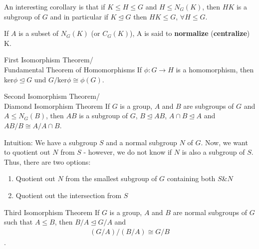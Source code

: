 \documentclass[titlepage, 12pt]{article}
\begin{document}
An interesting corollary is that if $ K \le H \le G$ and
$H\le N_G(K)$, then $HK$ is a subgroup of $G$ and in particular if
$K\trianglelefteq G$ then $HK\le G$, $\forall H\le G$.
\begin{definition}{}{}
    If $A$ is a subset of $N_G(K)$ (or $C_G(K)$), A is said to
    \textbf{normalize} (\textbf{centralize}) K.
\end{definition}
\begin{theorem}{First Isomorphism Theorem/\\Fundamental Theorem of Homomorphisms}{}
    If $\phi:G\rightarrow H$ is a homomorphism, then ker$\phi\trianglelefteq G$
    und $G/\text{ker}\phi\cong \phi(G)$.
\end{theorem}
\begin{theorem}{Second Isomorphism Theorem/\\Diamond Isomorphism Theorem}{}
    If $G$ is a group, $A$ and $B$ are subgroups of $G$ and $A\le N_G(B)$, then
    $AB$ is a subgroup of $G$, $B\trianglelefteq AB$, $A\cap B\trianglelefteq A$
    and $AB/B\cong A/A\cap B$.
\end{theorem}
Intuition: We have a subgroup $S$ and a normal subgroup $N$ of $G$. Now, we want
to quotient out $N$ from $S$ - however, we do not know if $N$ is also a subgroup
of $S$. Thus, there are two options:
\begin{enumerate}
    \item Quotient out $N$ from the smallest subgroup of $G$ containing both
        $S$\&$N$
    \item Quotient out the intersection from $S$
\end{enumerate}
\begin{theorem}{Third Isomorphism Theorem}{}
    If $G$ is a group, $A$ and $B$ are normal subgroups of $G$ such that $A\le
    B$, then $B/A\trianglelefteq G/A$ and 
    \begin{align*}
        (G/A)/(B/A) \cong G/B
    \end{align*}.
\end{theorem}
\end{document}
